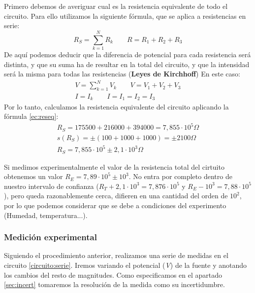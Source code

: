 \documentclass[12pt, a4paper, titlepage]{article}
\begin{document}
  Primero debemos de averiguar cual es la resistencia equivalente de todo el circuito. Para ello utilizamos la siguiente fórmula, que se aplica a resistencias en serie:
  \begin{equation} \label{ec:reseq}
    R_S = \sum_{k=1}^N R_k \qquad R = R_1 + R_2 + R_3
  \end{equation}
  De aquí podemos deducir que la diferencia de potencial para cada resistencia será distinta, y que su suma ha de resultar en la total del circuito, y que la intensidad será la misma para todas las resistencias (\textbf{Leyes de Kirchhoff}) En este caso:
  \begin{gather}
    V = \sum_{k=1}^N V_k \qquad V = V_1 + V_2 + V_3 \nonumber \\
    I = I_k \qquad I = I_1 = I_2 = I_3 \label{ec:kriser}
  \end{gather}
  Por lo tanto, calculamos la resistencia equivalente del circuito aplicando la fórmula \ref{ec:reseq}:
  \begin{gather}
    R_S = 175500 + 216000 + 394000 = 7,855 \cdot 10^5 \Omega \nonumber \\ s(R_S) = \pm(100 + 1000 + 1000) = \pm2100 \Omega \nonumber \\ R_S = 7,855 \cdot 10^5 \pm 2,1 \cdot 10^3 \Omega \nonumber
  \end{gather}

  Si medimos experimentalmente el valor de la resistencia total del cirtuito obtenemos un valor $R_E = 7,89 \cdot 10^5 \pm 10^3$. No entra por completo dentro de nuestro intervalo de confianza ($R_T + 2,1 \cdot 10^3 = 7,876 \cdot 10^5$ y $R_E - 10^3 = 7,88 \cdot 10^5$), pero queda razonablemente cerca, difieren en una cantidad del orden de $10^2$, por lo que podemos considerar que se debe a condiciones del experimento (Humedad, temperatura...).

  \subsubsection{Medición experimental}

  Siguiendo el procedimiento anterior, realizamos una serie de medidas en el circuito \ref{circuito:serie}. Iremos variando el potencial (\textit{V}) de la fuente y anotando los cambios del resto de magnitudes. Como especificamos en el apartado \ref{sec:incert} tomaremos la resolución de la medida como su incertidumbre.
\end{document}
